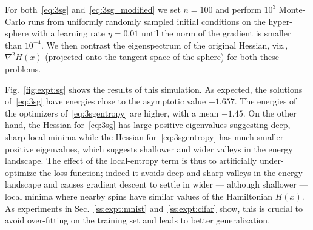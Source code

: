 \documentclass[10pt]{article}
\begin{document}
\begin{appendices}
{For both~\eqref{eq:3sg} and~\eqref{eq:3sg_modified} we set $n = 100$ and perform $10^3$ Monte-Carlo runs from uniformly randomly sampled initial conditions on the hyper-sphere with a learning rate $\eta = 0.01$ until the norm of the gradient is smaller than $10^{-4}$. We then contrast the eigenspectrum of the original Hessian, viz., $\nabla^2 H(x)$ (projected onto the tangent space of the sphere) for both these problems.

Fig.~\ref{fig:expt:sg} shows the results of this simulation. As expected, the solutions of~\eqref{eq:3sg} have energies close to the asymptotic value $-1.657$. The energies of the optimizers of~\eqref{eq:3sgentropy} are higher, with a mean $-1.45$. On the other hand, the Hessian for~\eqref{eq:3sg} has large positive eigenvalues suggesting deep, sharp local minima while the Hessian for~\eqref{eq:3sgentropy} has much smaller positive eigenvalues, which suggests shallower and wider valleys in the energy landscape. The effect of the local-entropy term is thus to artificially under-optimize the loss function; indeed it avoids deep and sharp valleys in the energy landscape and causes gradient descent to settle in wider --- although shallower --- local minima where nearby spins have similar values of the Hamiltonian $H(x)$. As experiments in Sec.~\ref{ss:expt:mnist} and~\ref{ss:expt:cifar} show, this is crucial to avoid over-fitting on the training set and leads to better generalization.
}

\end{appendices}
\end{document}
